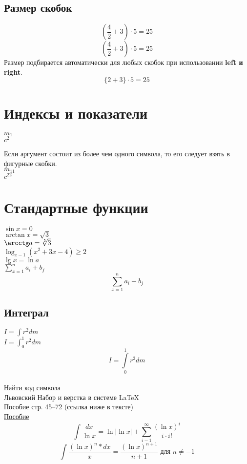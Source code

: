 \documentclass[a4paper,12pt]{article} %
\begin{document}
\subsection*{Размер скобок}
$$ (\frac{4}{2}+3) \cdot 5=25 $$
$$ \left(\frac{4}{2}+3\right) \cdot 5=25 $$ Размер подбирается автоматически для любых скобок при использовании \textbf{left и right}.
$$ \{2+3\} \cdot 5=25 $$

\section{Индексы и показатели}
$m_1$\\
$c^2$

Если аргумент состоит из более чем одного символа, то его следует взять в фигурные скобки.\\
$m_{11}$\\
$c^{22}$

\section{Стандартные функции}
$\sin x=0$\\
$\arctan x=\sqrt{3}$\\
$\arcctg a=\sqrt[5]{3}$\\
$\log_{x-1}{(x^2+3x-4)} \geqslant2$\\
$\lg x=\ln a$\\
$\sum_{x=1}^{n}a_i+b_j$
\begin{equation}
\sum_{x=1}^{n}a_i+b_j
\end{equation}

\subsection*{Интеграл}
$I=\int r^2dm$\\
$I=\int _{0}^{1} r^2dm$\\
$$I=\int\limits _{0}^{1} r^2dm$$\\
\href{http://detexify.kirelabs.org/classify.html}{Найти код символа}\\
Львовский Набор и верстка в системе \LaTeX\\
Пособие стр. 45--72 (ссылка ниже в тексте)\\
\href{https://bit.ly/3mvbiuv}{Пособие}\\

$$ \int \frac{dx}{\ln x}=\ln |\ln x| + \sum_{i-1}^{\infty}\frac{(\ln x)^i}{i\cdot i!} $$
$$ \int \frac{(\ln x)^n*dx}{x}=\frac{(\ln x)^{n+1}}{n+1} \text{ для } n\neq -1 $$
\end{document}

